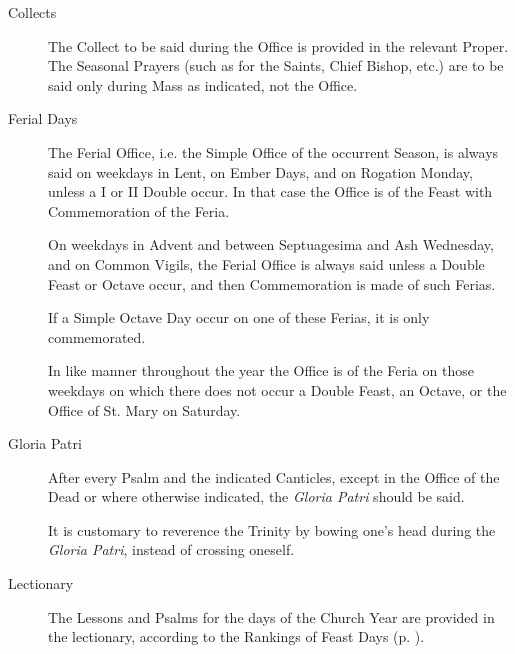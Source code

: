 \begin{description}
\item[Collects] The Collect to be said during the Office is provided in the relevant Proper. The Seasonal Prayers (such as for the Saints, Chief Bishop, etc.) are to be said only during Mass as indicated, not the Office.
\item[Ferial Days] The Ferial Office, i.e. the Simple Office of the occurrent Season, is always said on weekdays in Lent, on Ember Days, and on Rogation Monday, unless a I or II Double occur. In that case the Office is of the Feast with Commemoration of the Feria.\par
On weekdays in Advent and between Septuagesima and Ash Wednesday, and on Common Vigils, the Ferial Office is always said unless a Double Feast or Octave occur, and then Commemoration is made of such Ferias.\par
If a Simple Octave Day occur on one of these Ferias, it is only commemorated.\par
In like manner throughout the year the Office is of the Feria on those weekdays on which there does not occur a Double Feast, an Octave, or the Office of St. Mary on Saturday.
\item[Gloria Patri] After every Psalm and the indicated Canticles, except in the Office of the Dead or where otherwise indicated, the \emph{Gloria Patri} should be said.\par
It is customary to reverence the Trinity by bowing one's head during the \emph{Gloria Patri}, instead of crossing oneself.
\item[Lectionary] The Lessons and Psalms for the days of the Church Year are provided in the lectionary, according to the Rankings of Feast Days (p. \pageref{ranking}).\par

\end{description}
